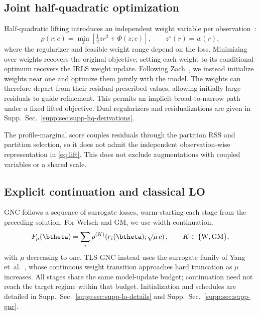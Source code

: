 \documentclass[runningheads]{llncs}
\newcommand{\suppsec}[1]{Supp.\ Sec.~\ref{supp:#1}}
\begin{document}
\subsection{Joint half-quadratic optimization}
\label{sec:lift-theory}

Half-quadratic lifting introduces an independent weight variable
per observation~\cite{GemanReynolds1992,BlackRangarajan1996}:
\begin{equation}
	\rho(r;c)
	=\min_z\left[\tfrac12zr^2+\Phi(z;c)\right],
	\qquad z^\star(r)=w(r),
	\label{eq:lift}
\end{equation}
where the regularizer and feasible weight range depend on the loss.
Minimizing over weights recovers the original objective; setting
each weight to its conditional optimum recovers the IRLS weight update.
Following Zach~\cite{Zach2014,ZachBourmaud2018}, we instead initialize
weights near one and optimize them jointly with the model.
The weights can therefore depart from their residual-prescribed
values, allowing initially large residuals to guide refinement.
This permits an implicit broad-to-narrow path under a fixed lifted
objective. Dual regularizers and residualizations are given in
\suppsec{sec:supp-hq-derivations}.

The profile-marginal score couples residuals through the partition RSS
and partition selection, so it does not admit the independent
observation-wise representation in \cref{eq:lift}.
This does not exclude augmentations with coupled variables or
a shared scale.

\subsection{Explicit continuation and classical LO}
\label{sec:gnc}

GNC follows a sequence of surrogate losses, warm-starting each stage
from the preceding solution. For Welsch and GM, we use width
continuation,
\begin{equation}
	F_\mu(\btheta)
	=\sum_i\rho^{(K)}\!\left(r_i(\btheta);\sqrt{\mu}\,c\right),
	\qquad K\in\{\mathrm W,\mathrm{GM}\},
	\label{eq:gnc-family}
\end{equation}
with $\mu$ decreasing to one. TLS-GNC instead uses the surrogate
family of Yang et~al.~\cite{YangCarlone2020}, whose continuous
weight transition approaches hard truncation as $\mu$ increases.
All stages share the same model-update budget; continuation need
not reach the target regime within that budget.
Initialization and schedules are detailed in
\suppsec{sec:supp-lo-details} and \suppsec{sec:supp-gnc}.
\end{document}
